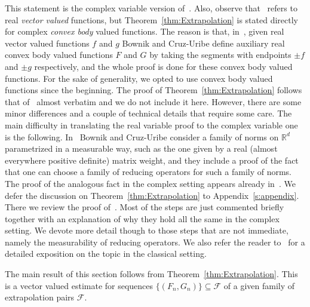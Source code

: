 \documentclass{article}
\theoremstyle{definition}
\theoremstyle{remark}
\numberwithin{equation}{section}
\newcommand{\cF}{\mathcal{F}}
\newcommand{\reals}{\mathbb{R}}
\newcommand{\1}{\mathbf{1}}
\begin{document}
    This statement is the complex variable version of~\cite[Theorem~9.1]{Cruz_Uribe_Bownik_Extrapolation}.
    Also, observe that~\cite[Theorem~9.1]{Cruz_Uribe_Bownik_Extrapolation}
    refers to real \emph{vector valued} functions, but Theorem~\ref{thm:Extrapolation}
    is stated directly for complex \emph{convex body} valued functions.
    The reason is that, in~\cite{Cruz_Uribe_Bownik_Extrapolation},
    given real vector valued functions $f$ and $g$ Bownik and Cruz-Uribe
    define auxiliary real convex body valued functions $F$ and $G$ by taking
    the segments with endpoints $\pm f$ and $\pm g$ respectively,
    and the whole proof is done for these convex body valued functions.
    For the sake of generality, we opted to use convex body valued functions since the beginning.
    The proof of Theorem~\ref{thm:Extrapolation} follows that
    of~\cite[Theorem~9.1]{Cruz_Uribe_Bownik_Extrapolation} almost verbatim
    and we do not include it here.
    However, there are some minor differences and a couple of technical details
    that require some care.
    The main difficulty in translating the real variable proof to the complex variable one is the following.
    In~\cite{Cruz_Uribe_Bownik_Extrapolation} Bownik and Cruz-Uribe consider a family of norms
    on $\reals^d$ parametrized in a measurable way,
    such as the one given by a real (almost everywhere positive definite) matrix weight,
    and they include a proof of the fact that one can choose
    a family of reducing operators for such a family of norms.
    The proof of the analogous fact in the complex setting appears already
    in~\cite[Section~9]{DKPS2024}.
    We defer the discussion on Theorem~\ref{thm:Extrapolation} to Appendix~\ref{s:appendix}.
    There we review the proof of~\cite[Theorem~9.1]{Cruz_Uribe_Bownik_Extrapolation}.
    Most of the steps are just commented briefly together with an explanation of why
    they hold all the same in the complex setting.
    We devote more detail though to those steps that are not immediate,
    namely the measurability of reducing operators.
    We also refer the reader to~\cite[Chapter~I.3]{Book_Extrapolation} for a detailed exposition on the topic in the classical setting.

    The main result of this section follows from Theorem~\ref{thm:Extrapolation}.
    This is a vector valued estimate for sequences $\{(F_n,G_n)\} \subseteq \cF$
    of a given family of extrapolation pairs $\cF.$
\end{document}
